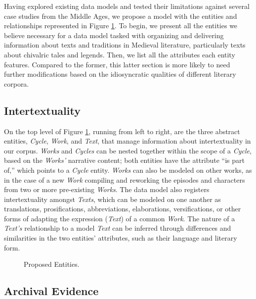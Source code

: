 Having explored existing data models and tested their limitations against several case studies from the Middle Ages, we propose a model with the entities and relationships represented in Figure \ref{fig:ProposedEntities}. To begin, we present all the entities we believe necessary for a data model tasked with organizing and delivering information about texts and traditions in Medieval literature, particularly texts about chivalric tales and legends. Then, we list all the attributes each entity features. Compared to the former, this latter section is more likely to need further modifications based on the idiosyncratic qualities of different literary corpora.

\subsection{Intertextuality}

On the top level of Figure \ref{fig:ProposedEntities}, running from left to right, are the three abstract entities, \textit{Cycle}, \textit{Work}, and \textit{Text}, that manage information about intertextuality in our corpus. \textit{Works} and \textit{Cycles} can be nested together within the scope of a \textit{Cycle}, based on the \textit{Works'} narrative content; both entities have the attribute ``is part of,'' which points to a \textit{Cycle} entity. \textit{Works} can also be modeled on other works, as in the case of a new \textit{Work} compiling and reworking the episodes and characters from two or more pre-existing \textit{Works}. The data model also registers intertextuality amongst \textit{Texts}, which can be modeled on one another as translations, prosifications, abbreviations, elaborations, versifications, or other forms of adapting the expression (\textit{Text}) of a common \textit{Work}. The nature of a \textit{Text's} relationship to a model \textit{Text} can be inferred through differences and similarities in the two entities' attributes, such as their language and literary form.

\begin{figure}[httb!]
    \begin{center}
        
    \end{center}
\caption{Proposed Entities.}
\label{fig:ProposedEntities}
\end{figure}

\subsection{Archival Evidence}

